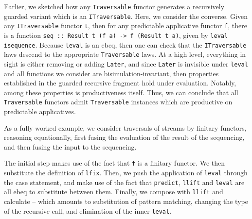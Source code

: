 \documentclass[sigplan,screen]{acmart}
\newcommand{\hs}{\texttt}
\newcommand{\hsn}{\texttt}
\begin{document}
Earlier, we sketched how any \hs{Traversable} functor generates a recursively guarded variant which is an \hs{ITraversable}. Here, we consider the converse. Given any \hs{ITraversable} functor \hs{t}, then for any predictable applicative functor \hs{f}, there is a function \hs{seq :: Result t (f a) -> f (Result t a)}, given by \hsn{leval isequence}. Because \hs{leval} is an ebeq, then one can check that the \hs{ITraversable} laws descend to the appropriate \hs{Traversable} laws. At a high level, everything in sight is either removing or adding \hs{Later}, and since \hs{Later} is invisible under \hs{leval} and all functions we consider are bisimulation-invariant, then properties established in the guarded recursive fragment hold under evaluation. Notably, among these properties is productiveness itself. Thus, we can conclude that all \hs{Traversable} functors admit \hs{Traversable} instances which are productive on predictable applicatives.

As a fully worked example, we consider traversals of streams by finitary functors, reasoning equationally, first fusing the evaluation of the result of the sequencing, and then fusing the input to the sequencing.

The initial step makes use of the fact that \hs{f} is a finitary functor. We then substitute the definition of \hs{lfix}. Then, we push the application of \hs{leval} through the case statement, and make use of the fact that \hs{predict},  \hs{llift} and \hs{leval} are all ebeq to substitute between them. Finally, we compose with \hs{llift} and calculate -- which amounts to substitution of pattern matching, changing the type of the recursive call, and elimination of the inner \hs{leval}.
\end{document}
